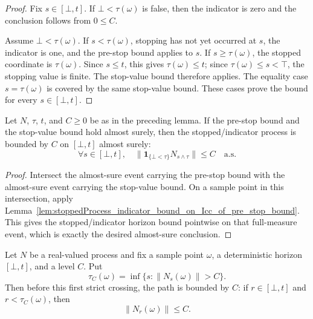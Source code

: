 \begin{proof}
Fix \(s\in[\bot,t]\).  If \(\bot<\tau(\omega)\) is false, then the indicator
is zero and the conclusion follows from \(0\le C\).

Assume \(\bot<\tau(\omega)\).  If \(s<\tau(\omega)\), stopping has not yet
occurred at \(s\), the indicator is one, and the pre-stop bound applies to
\(s\).  If \(s\ge\tau(\omega)\), the stopped coordinate is \(\tau(\omega)\).
Since \(s\le t\), this gives \(\tau(\omega)\le t\); since
\(\tau(\omega)\le s<\top\), the stopping value is finite.  The stop-value
bound therefore applies.  The equality case \(s=\tau(\omega)\) is covered by
the same stop-value bound.  These cases prove the bound for every
\(s\in[\bot,t]\).
\end{proof}

\begin{lemma}\label{lem:ae_stoppedProcess_indicator_bound_on_Icc_of_pre_stop_bound}
Let \(N\), \(\tau\), \(t\), and \(C\ge0\) be as in the preceding lemma.  If
the pre-stop bound and the stop-value bound hold almost surely, then the
stopped/indicator process is bounded by \(C\) on \([\bot,t]\) almost surely:
\[
  \forall s\in[\bot,t],\quad
  \bigl\|
    \mathbf 1_{\{\bot<\tau\}}N_{s\wedge\tau}
  \bigr\|\le C
  \quad\text{a.s.}
\]
\end{lemma}

\begin{proof}
Intersect the almost-sure event carrying the pre-stop bound with the
almost-sure event carrying the stop-value bound.  On a sample point in this
intersection, apply
Lemma~\ref{lem:stoppedProcess_indicator_bound_on_Icc_of_pre_stop_bound}.
This gives the stopped/indicator horizon bound pointwise on that full-measure
event, which is exactly the desired almost-sure conclusion.
\end{proof}

\begin{lemma}\label{lem:leastGT_norm_pre_stop_bound_on_Icc}
Let \(N\) be a real-valued process and fix a sample point \(\omega\), a
deterministic horizon \([\bot,t]\), and a level \(C\).  Put
\[
  \tau_C(\omega)=\inf\{s:\|N_s(\omega)\|>C\}.
\]
Then before this first strict crossing, the path is bounded by \(C\): if
\(r\in[\bot,t]\) and \(r<\tau_C(\omega)\), then
\[
  \|N_r(\omega)\|\le C .
\]
\end{lemma}

